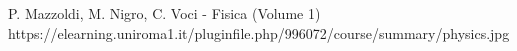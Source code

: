 
P. Mazzoldi, M. Nigro, C. Voci - Fisica (Volume 1)
https://elearning.uniroma1.it/pluginfile.php/996072/course/summary/physics.jpg
